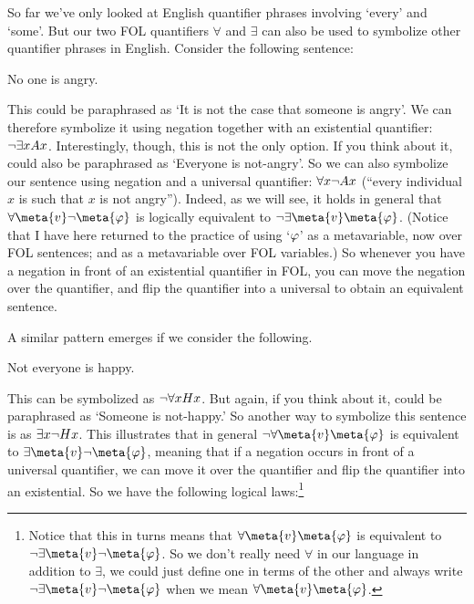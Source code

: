 So far we've only looked at English quantifier phrases involving `every' and `some'.  But our two FOL quantifiers $\forall$ and $\exists$ can also be used to symbolize other quantifier phrases in English.  Consider the following sentence:
	\begin{earg}
		\item[\ex{q.neg1}] No one is angry.
	\end{earg}
This could be paraphrased as `It is not the case that someone is angry'.  We can therefore symbolize it using negation together with an existential quantifier: $\neg \exists x Ax$.  Interestingly, though, this is not the only option.  If you think about it,  could also be paraphrased as `Everyone is not-angry'. So we can also symbolize our sentence  using negation and a universal quantifier: $\forall x \neg Ax$ (``every individual $x$ is such that $x$ is not angry''). Indeed, as we will see, it holds in general that $\forall \meta{v} \enot\meta{\varphi}$ is logically equivalent to $\enot\exists \meta{v}\meta{\varphi}$. (Notice that I have here returned to the practice of using `$\mathcal{\varphi}$' as a metavariable, now over FOL sentences; and  as a metavariable over FOL variables.)   So whenever you have a negation in front of an existential quantifier in FOL, you can move the negation over the quantifier, and flip the quantifier into a universal to obtain an equivalent sentence.

A similar pattern emerges if we consider the following.
	\begin{earg}
		\item[\ex{q.neg2}] Not everyone is happy.
	\end{earg}
This can be symbolized as $\neg \forall x Hx$.  But again, if you think about it,  could be paraphrased as `Someone is not-happy.'  So another way to symbolize this sentence is as $\exists x\neg Hx$.  This illustrates that in general $\enot \forall \meta{v} \meta{\varphi}$ is equivalent to $\exists \meta{v} \enot \meta{\varphi}$, meaning that if a negation occurs in front of a universal quantifier, we can move it over the quantifier and flip the quantifier into an existential.  So we have the following logical laws:\footnote{Notice that this in turns means that $\forall \meta{v} \meta{\varphi}$ is equivalent to $\enot \exists\meta{v}  \enot  \meta{\varphi}$.  So we don't really need $\forall$ in our language in addition to $\exists$, we could just define one in terms of the other and always write $\enot \exists \meta{v} \enot  \meta{\varphi}$ when we mean $\forall \meta{v} \meta{\varphi}$.}

